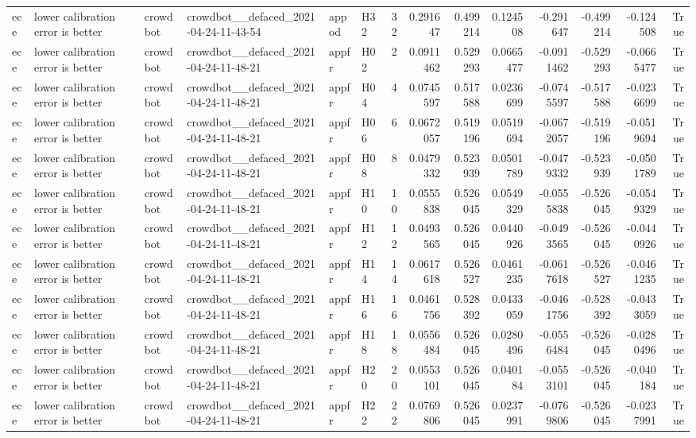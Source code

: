 \begin{longtable}{llllllrrrrrrrr}
ece & lower calibration error is better & crowdbot & crowdbot\_\_defaced\_2021-04-24-11-43-54 & appod & H32 & 32 & 0.291647 & 0.499214 & 0.124508 & -0.291647 & -0.499214 & -0.124508 & True \\
ece & lower calibration error is better & crowdbot & crowdbot\_\_defaced\_2021-04-24-11-48-21 & appfr & H02 & 2 & 0.0911462 & 0.529293 & 0.0665477 & -0.0911462 & -0.529293 & -0.0665477 & True \\
ece & lower calibration error is better & crowdbot & crowdbot\_\_defaced\_2021-04-24-11-48-21 & appfr & H04 & 4 & 0.0745597 & 0.517588 & 0.0236699 & -0.0745597 & -0.517588 & -0.0236699 & True \\
ece & lower calibration error is better & crowdbot & crowdbot\_\_defaced\_2021-04-24-11-48-21 & appfr & H06 & 6 & 0.0672057 & 0.519196 & 0.0519694 & -0.0672057 & -0.519196 & -0.0519694 & True \\
ece & lower calibration error is better & crowdbot & crowdbot\_\_defaced\_2021-04-24-11-48-21 & appfr & H08 & 8 & 0.0479332 & 0.523939 & 0.0501789 & -0.0479332 & -0.523939 & -0.0501789 & True \\
ece & lower calibration error is better & crowdbot & crowdbot\_\_defaced\_2021-04-24-11-48-21 & appfr & H10 & 10 & 0.0555838 & 0.526045 & 0.0549329 & -0.0555838 & -0.526045 & -0.0549329 & True \\
ece & lower calibration error is better & crowdbot & crowdbot\_\_defaced\_2021-04-24-11-48-21 & appfr & H12 & 12 & 0.0493565 & 0.526045 & 0.0440926 & -0.0493565 & -0.526045 & -0.0440926 & True \\
ece & lower calibration error is better & crowdbot & crowdbot\_\_defaced\_2021-04-24-11-48-21 & appfr & H14 & 14 & 0.0617618 & 0.526527 & 0.0461235 & -0.0617618 & -0.526527 & -0.0461235 & True \\
ece & lower calibration error is better & crowdbot & crowdbot\_\_defaced\_2021-04-24-11-48-21 & appfr & H16 & 16 & 0.0461756 & 0.528392 & 0.0433059 & -0.0461756 & -0.528392 & -0.0433059 & True \\
ece & lower calibration error is better & crowdbot & crowdbot\_\_defaced\_2021-04-24-11-48-21 & appfr & H18 & 18 & 0.0556484 & 0.526045 & 0.0280496 & -0.0556484 & -0.526045 & -0.0280496 & True \\
ece & lower calibration error is better & crowdbot & crowdbot\_\_defaced\_2021-04-24-11-48-21 & appfr & H20 & 20 & 0.0553101 & 0.526045 & 0.040184 & -0.0553101 & -0.526045 & -0.040184 & True \\
ece & lower calibration error is better & crowdbot & crowdbot\_\_defaced\_2021-04-24-11-48-21 & appfr & H22 & 22 & 0.0769806 & 0.526045 & 0.0237991 & -0.0769806 & -0.526045 & -0.0237991 & True \\

\end{longtable}
